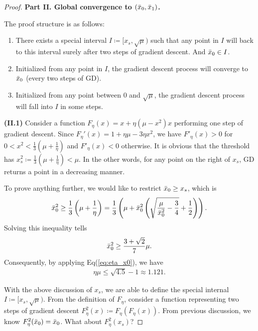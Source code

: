 \documentclass{article}
\theoremstyle{plain}
\theoremstyle{remark}
\begin{document}
\begin{proof}
\textbf{Part II. Global convergence to $(\Bar{x}_0, \Bar{x}_1)$.}

The proof structure is as follows:
\begin{enumerate}
    \item There exists a special interval $I\coloneqq[x_s, \sqrt{\mu})$ such that any point in $I$ will back to this interval surely after two steps of gradient descent. And $\Bar{x}_0\in I$.
    \item Initialized from any point in $I$, the gradient descent process will converge to $\Bar{x}_0$ (every two steps of GD).
    \item Initialized from any point between 0 and $\sqrt{\mu}$, the gradient descent process will fall into $I$ in some steps.
\end{enumerate}

\textbf{(II.1)} Consider a function $F_{\eta}(x)=x+\eta(\mu-x^2)x$ performing one step of gradient descent. Since $F_{\eta}'(x)=1+\eta\mu-3\eta x^2$, we have $F'_\eta(x)>0$ for $0<x^2<\frac{1}{3}\left(\mu+\frac{1}{\eta}\right)$ and $F'_\eta(x)<0$ otherwise. It is obvious that the threshold has $x_s^2\coloneqq\frac{1}{3}\left(\mu+\frac{1}{\eta}\right)<\mu$. In the other words, for any point on the right of $x_s$, GD returns a point in a decreasing manner.

To prove anything further, we would like to restrict $\Bar{x}_0 \ge x_s$, which is 
\begin{align*}
    \Bar{x}_0^2\ge \frac{1}{3}\left(\mu+\frac{1}{\eta}\right)
    =\frac{1}{3}
    \left(\mu 
    +
    \Bar{x}_0^2\left( \sqrt{\frac{\mu}{\Bar{x}_0^2}-\frac{3}{4}}+\frac{1}{2} \right)
    \right).
\end{align*}
Solving this inequality tells 
\begin{align}
    \Bar{x}_0^2\ge\frac{3+\sqrt{2}}{7}\mu.
\end{align}
Consequently, by applying Eq(\ref{eq:eta_x0}), we have
\begin{align}
    \eta\mu\le\sqrt{4.5}-1\approx 1.121.
\end{align}

With the above discussion of $x_s$, we are able to define the special internal $I\coloneqq[x_s,\sqrt{\mu})$. From the definition of $F_\eta$, consider a function representing two steps of gradient descent $F^2_\eta(x)\coloneqq F_\eta(F_\eta(x))$. From previous discussion, we know $F^2_\eta(\Bar{x}_0)=\Bar{x}_0$. What about $F_{\eta}^2(x_s)$?


\end{proof}
\end{document}

